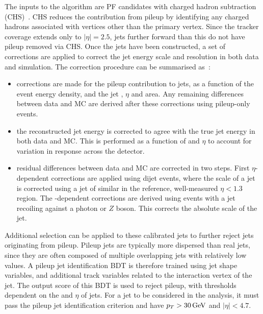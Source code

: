 The inputs to the \akt algorithm are PF candidates with charged hadron subtraction (CHS)~\cite{JEC}. 
CHS reduces the contribution from pileup by identifying any charged hadrons associated with vertices other than the primary vertex.
Since the tracker coverage extends only to $|\eta|=2.5$, 
jets further forward than this do not have pileup removed via CHS.
Once the jets have been constructed, a set of corrections are applied to correct the jet energy scale and resolution in both data and simulation.
The correction procedure can be summarised as~\cite{JEC}:
\begin{itemize}
  \item corrections are made for the pileup contribution to jets, as a function of the event energy density, 
        and the jet \pt, $\eta$ and area.
        Any remaining differences between data and MC are derived after these corrections using pileup-only events.
  \item the reconstructed jet energy is corrected to agree with the true jet energy in both data and MC.
        This is performed as a function of \pt and $\eta$ to account for variation in response across the detector.
  \item residual differences between data and MC are corrected in two steps.
        First $\eta$-dependent corrections are applied using dijet events, 
        where the scale of a jet is corrected using a jet of similar \pt in the reference, well-measured $\eta < 1.3$ region.
        The \pt-dependent corrections are derived using events with a jet recoiling against a photon or $Z$ boson.
        This corrects the absolute scale of the jet.
\end{itemize}

Additional selection can be applied to these calibrated jets to further reject jets originating from pileup.
Pileup jets are typically more dispersed than real jets, 
since they are often composed of multiple overlapping jets with relatively low \pt values.
A pileup jet identification BDT is therefore trained using jet shape variables, 
and additional track variables related to the interaction vertex of the jet.
The output score of this BDT is used to reject pileup, with thresholds dependent on the \pt and $\eta$ of jets.
For a jet to be considered in the analysis, it must pass the pileup jet identification criterion 
and have $p_T > \SI{30}{GeV}$ and $|\eta| < 4.7$.

